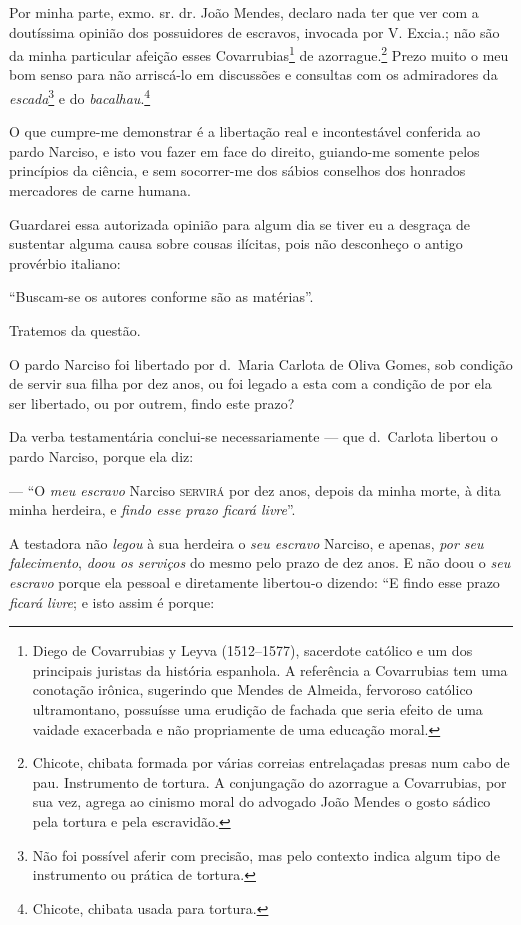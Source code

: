 {Por minha parte, exmo. sr. dr. João Mendes, declaro nada ter que ver com
a doutíssima opinião dos possuidores de escravos, invocada por V.
Excia.; não são da minha particular afeição esses Covarrubias\footnote{
  Diego de Covarrubias y Leyva (1512--1577), sacerdote católico e um dos
  principais juristas da história espanhola. A referência a Covarrubias
  tem uma conotação irônica, sugerindo que Mendes de Almeida, fervoroso
  católico ultramontano, possuísse uma erudição de fachada que seria
  efeito de uma vaidade exacerbada e não propriamente de uma educação
  moral.} de azorrague.\footnote{ Chicote,
  chibata formada por várias correias entrelaçadas presas num cabo de
  pau. Instrumento de tortura. A conjungação do azorrague a Covarrubias,
  por sua vez, agrega ao cinismo moral do advogado João Mendes o gosto
  sádico pela tortura e pela escravidão.} Prezo muito o meu bom senso
para não arriscá-lo em discussões e consultas com os admiradores da
\emph{escada}\footnote{ Não foi possível aferir com precisão, mas
  pelo contexto indica algum tipo de instrumento ou prática de tortura.}
e do \emph{bacalhau}.\footnote{ Chicote, chibata usada para tortura.}

O que cumpre-me demonstrar é a libertação real e incontestável conferida
ao pardo Narciso, e isto vou fazer em face do direito, guiando-me
somente pelos princípios da ciência, e sem socorrer-me dos sábios
conselhos dos honrados mercadores de carne humana.

Guardarei essa autorizada opinião para algum dia se tiver eu a desgraça
de sustentar alguma causa sobre cousas ilícitas, pois não desconheço o
antigo provérbio italiano:

``Buscam-se os autores conforme são as matérias''.

Tratemos da questão.

O pardo Narciso foi libertado por d.~Maria Carlota de Oliva Gomes, sob
condição de servir sua filha por dez anos, ou foi legado a esta com a
condição de por ela ser libertado, ou por outrem, findo este prazo?

Da verba testamentária conclui-se necessariamente --- que d.~Carlota
libertou o pardo Narciso, porque ela diz:

--- ``O \emph{meu escravo} Narciso \textsc{servirá} por dez anos, depois da minha
morte, à dita minha herdeira, e \emph{findo esse prazo ficará livre}''.

A testadora não \emph{legou} à sua herdeira o \emph{seu escravo}
Narciso, e apenas, \emph{por seu falecimento}, \emph{doou os serviços}
do mesmo pelo prazo de dez anos. E não doou o \emph{seu escravo} porque
ela pessoal e diretamente libertou-o dizendo: ``E findo esse prazo
\emph{ficará livre}; e isto assim é porque:

}
